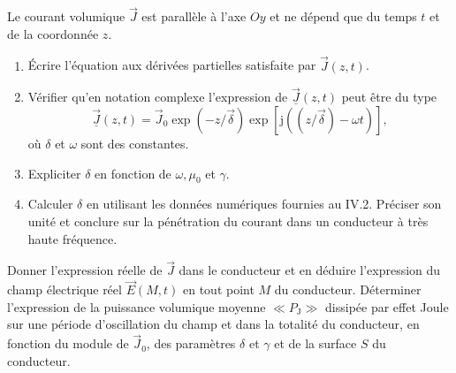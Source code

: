 \begin{quest}
        \item Le courant volumique \(\Vec{J}\) est parallèle à l'axe \(O y\) et ne dépend que du temps \(t\) et de la coordonnée \(z\).
        \begin{enumerate}
            \item 
             Écrire l'équation aux dérivées partielles satisfaite par \(\Vec{J}(z, t)\).
            \item Vérifier qu'en notation complexe l'expression de \(\underline{\Vec{J}}(z, t)\) peut être du type 
            \[
            \underline{\Vec{J}}(z, t)=\Vec{J}_{0} \exp (-z / \Vec{\delta}) \exp [\mathrm{j}((z / \Vec{\delta})-\omega t)],
            \] où \(\delta\) et \(\omega\) sont des constantes.

            \item Expliciter \(\delta\) en fonction de \(\omega, \mu_{0}\) et \(\gamma\).
            \item Calculer \(\delta\) en utilisant les données numériques fournies au IV.2. Préciser son unité et conclure sur la pénétration du courant dans un conducteur à très haute fréquence.
        \end{enumerate}
        \item Donner l'expression réelle de \(\Vec{J}\) dans le conducteur et en déduire l'expression du champ électrique réel \(\Vec{E}(M, t)\) en tout point \(M\) du conducteur. Déterminer l'expression de la puissance volumique moyenne \(\ll P_{\mathrm{J}} \gg\) dissipée par effet Joule sur une période d'oscillation du champ et dans la totalité du conducteur, en fonction du module de \(\Vec{J}_{0}\), des paramètres \(\delta\) et \(\gamma\) et de la surface \(S\) du conducteur.
\end{quest}
